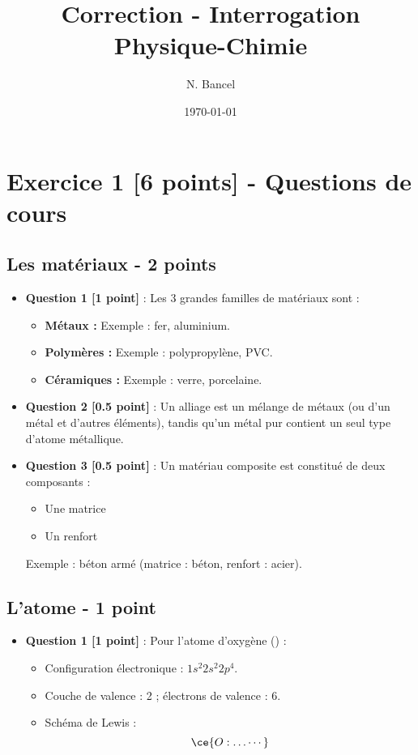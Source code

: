 \documentclass[a4paper,12pt]{article}
\title{Correction - Interrogation Physique-Chimie}
\author{N. Bancel}
\date{\today}
\begin{document}
\maketitle

\section*{Exercice 1 [6 points] - Questions de cours}

\subsection*{Les matériaux - 2 points}
\begin{itemize}
    \item \textbf{Question 1 [1 point]} : Les 3 grandes familles de matériaux sont :
    \begin{itemize}
        \item \textbf{Métaux :} Exemple : fer, aluminium.
        \item \textbf{Polymères :} Exemple : polypropylène, PVC.
        \item \textbf{Céramiques :} Exemple : verre, porcelaine.
    \end{itemize}

    \item \textbf{Question 2 [0.5 point]} : Un alliage est un mélange de métaux (ou d'un métal et d'autres éléments), tandis qu'un métal pur contient un seul type d'atome métallique.
    \item \textbf{Question 3 [0.5 point]} : Un matériau composite est constitué de deux composants :
    \begin{itemize}
        \item Une matrice
        \item Un renfort
    \end{itemize}
    Exemple : béton armé (matrice : béton, renfort : acier).
\end{itemize}

\subsection*{L'atome - 1 point}
\begin{itemize}
    \item \textbf{Question 1 [1 point]} : Pour l'atome d'oxygène () :
    \begin{itemize}
        \item Configuration électronique : $1s^2 2s^2 2p^4$.
        \item Couche de valence : 2 ; électrons de valence : 6.
        \item Schéma de Lewis :
        \[
        \ce{O: \dots \cdots }
        \]
    \end{itemize}
\end{itemize}
\end{document}
